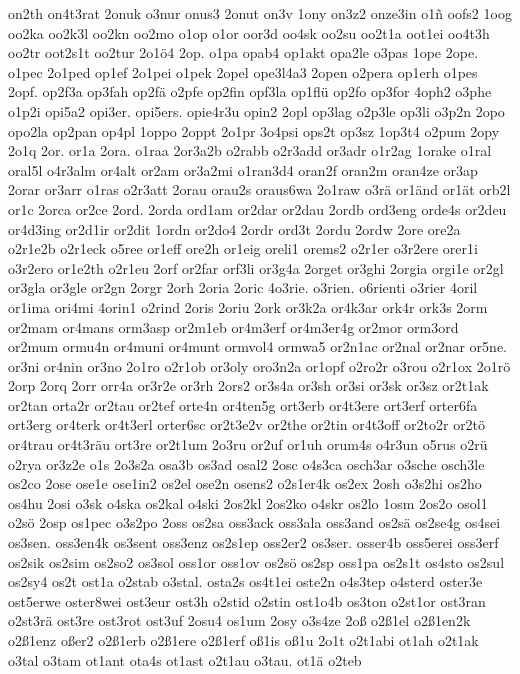 {on2th
on4t3rat
2onuk
o3nur
onus3
2onut
on3v
1ony
on3z2
onze3in
o1ñ
oofs2
1oog
oo2ka
oo2k3l
oo2kn
oo2mo
o1op
o1or
oor3d
oo4sk
oo2su
oo2t1a
oot1ei
oo4t3h
oo2tr
oot2s1t
oo2tur
2o1ö4
2op.
o1pa
opab4
op1akt
opa2le
o3pas
1ope
2ope.
o1pec
2o1ped
op1ef
2o1pei
o1pek
2opel
ope3l4a3
2open
o2pera
op1erh
o1pes
2opf.
op2f3a
op3fah
op2fä
o2pfe
op2fin
opf3la
op1flü
op2fo
op3for
4oph2
o3phe
o1p2i
opi5a2
opi3er.
opi5ers.
opie4r3u
opin2
2opl
op3lag
o2p3le
op3li
o3p2n
2opo
opo2la
op2pan
op4pl
1oppo
2oppt
2o1pr
3o4psi
ops2t
op3sz
1op3t4
o2pum
2opy
2o1q
2or.
or1a
2ora.
o1raa
2or3a2b
o2rabb
o2r3add
or3adr
o1r2ag
1orake
o1ral
oral5l
o4r3alm
or4alt
or2am
or3a2mi
o1ran3d4
oran2f
oran2m
oran4ze
or3ap
2orar
or3arr
o1ras
o2r3att
2orau
orau2s
oraus6wa
2o1raw
o3rä
or1änd
or1ät
orb2l
or1c
2orca
or2ce
2ord.
2orda
ord1am
or2dar
or2dau
2ordb
ord3eng
orde4s
or2deu
or4d3ing
or2d1ir
or2dit
1ordn
or2do4
2ordr
ord3t
2ordu
2ordw
2ore
ore2a
o2r1e2b
o2r1eck
o5ree
or1eff
ore2h
or1eig
oreli1
orems2
o2r1er
o3r2ere
orer1i
o3r2ero
or1e2th
o2r1eu
2orf
or2far
orf3li
or3g4a
2orget
or3ghi
2orgia
orgi1e
or2gl
or3gla
or3gle
or2gn
2orgr
2orh
2oria
2oric
4o3rie.
o3rien.
o6rienti
o3rier
4oril
or1ima
ori4mi
4orin1
o2rind
2oris
2oriu
2ork
or3k2a
or4k3ar
ork4r
ork3s
2orm
or2mam
or4mans
orm3asp
or2m1eb
or4m3erf
or4m3er4g
or2mor
orm3ord
or2mum
ormu4n
or4muni
or4munt
ormvol4
ormwa5
or2n1ac
or2nal
or2nar
or5ne.
or3ni
or4nin
or3no
2o1ro
o2r1ob
or3oly
oro3n2a
or1opf
o2ro2r
o3rou
o2r1ox
2o1rö
2orp
2orq
2orr
orr4a
or3r2e
or3rh
2ors2
or3s4a
or3sh
or3si
or3sk
or3sz
or2t1ak
or2tan
orta2r
or2tau
or2tef
orte4n
or4ten5g
ort3erb
or4t3ere
ort3erf
orter6fa
ort3erg
or4terk
or4t3erl
orter6sc
or2t3e2v
or2the
or2tin
or4t3off
or2to2r
or2tö
or4trau
or4t3räu
ort3re
or2t1um
2o3ru
or2uf
or1uh
orum4s
o4r3un
o5rus
o2rü
o2rya
or3z2e
o1s
2o3s2a
osa3b
os3ad
osal2
2osc
o4s3ca
osch3ar
o3sche
osch3le
os2co
2ose
ose1e
ose1in2
os2el
ose2n
osens2
o2s1er4k
os2ex
2osh
o3s2hi
os2ho
os4hu
2osi
o3sk
o4ska
os2kal
o4ski
2os2kl
2os2ko
o4skr
os2lo
1osm
2os2o
osol1
o2sö
2osp
os1pec
o3s2po
2oss
os2sa
oss3ack
oss3ala
oss3and
os2sä
os2se4g
os4sei
os3sen.
oss3en4k
os3sent
oss3enz
os2s1ep
oss2er2
os3ser.
osser4b
oss5erei
oss3erf
os2sik
os2sim
os2so2
os3sol
oss1or
oss1ov
os2sö
os2sp
oss1pa
os2s1t
os4sto
os2sul
os2sy4
os2t
ost1a
o2stab
o3stal.
osta2s
os4t1ei
oste2n
o4s3tep
o4sterd
oster3e
ost5erwe
oster8wei
ost3eur
ost3h
o2stid
o2stin
ost1o4b
os3ton
o2st1or
ost3ran
o2st3rä
ost3re
ost3rot
ost3uf
2osu4
os1um
2osy
o3s4ze
2oß
o2ß1el
o2ß1en2k
o2ß1enz
oßer2
o2ß1erb
o2ß1ere
o2ß1erf
oß1is
oß1u
2o1t
o2t1abi
ot1ah
o2t1ak
o3tal
o3tam
ot1ant
ota4s
ot1ast
o2t1au
o3tau.
ot1ä
o2teb
}
